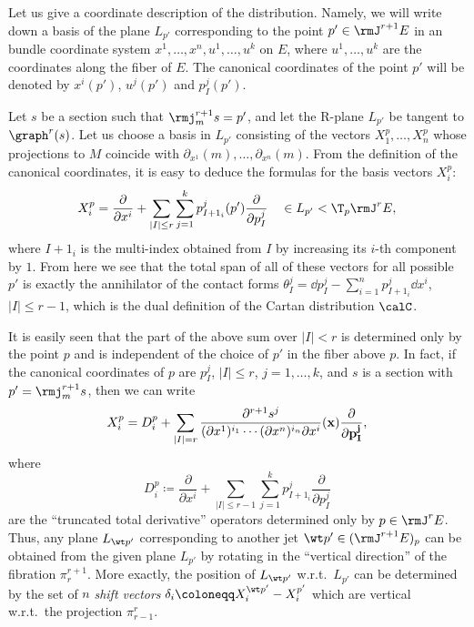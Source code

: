 Let us give a coordinate description of the distribution. Namely, we will write down a basis of the plane $L_{p'}$ corresponding to the point $p'\in \rmJ^{r+1}E$ in an bundle coordinate system $x^1,\ldots,x^n,u^1,\ldots,u^k$ on $E$, where $u^1,\ldots,u^k$ are the coordinates along the fiber of $E$. The canonical coordinates of the point $p'$ will be denoted by $x^i(p')$, $u^j(p')$ and $p^j_I(p')$.

Let $s$ be a section such that $\rmj^{r+1}_m s=p'$, and let the R-plane $L_{p'}$ be tangent to $\graph^r(s)$. Let us choose a basis in $L_{p'}$ consisting of the vectors $X_1^p,\ldots,X_n^p$ whose projections to $M$ coincide with $\partial_{x^1}(m),\ldots,\partial_{x^n}(m)$. From the definition of the canonical coordinates, it is easy to deduce the formulas for the basis vectors $X^p_i$:
\[X^p_i=\frac{\partial}{\partial x^i}+\sum_{|I|\leq r}\sum_{j=1}^k p^j_{I+1_i}(p')\frac{\partial}{\partial p^j_I}\quad \in L_{p'}<\T_p \rmJ^rE,\]
where $I+1_i$ is the multi-index obtained from $I$ by increasing its $i$-th component by $1$. From here we see that the total span of all of these vectors for all possible $p'$ is exactly the annihilator of the contact forms $\theta_I^j=\dd p^j_I-\sum_{i=1}^n p^j_{I+1_i}\dd x^i$, $|I|\leq r-1$, which is the dual definition of the Cartan distribution $\calC$.


It is easily seen that the part of the above sum over $|I|<r$ is determined only by the point $p$ and is independent of the choice of $p'$ in the fiber above $p$. In fact, if the canonical coordinates of $p$ are $p^j_I$, $|I|\leq r$, $j=1,\ldots,k$, and $s$ is a section with $p'=\rmj^{r+1}_m s$, then we can write 
\[X^p_i=D_i^p+\sum_{|I|=r}\frac{\partial^{r+1}s^j}{(\partial x^1)^{i_1}\cdots (\partial x^n)^{i_n}\partial x^i}(\bf{x})\frac{\partial}{\partial p^j_I},\]
where 
\[D_i^p\coloneqq \frac{\partial}{\partial x^i}+\sum_{|I|\leq r-1}\sum_{j=1}^k p^j_{I+1_i}\frac{\partial}{\partial p^j_I}\]
are the ``truncated total derivative'' operators determined only by $p\in \rmJ^rE$. Thus, any plane $L_{\wt p'}$ corresponding to another jet $\wt p'\in (\rmJ^{r+1}E)_p$ can be obtained from the given plane $L_{p'}$ by rotating in the ``vertical direction'' of the fibration $\pi^{r+1}_r$. More exactly, the position of $L_{\wt p'}$ w.r.t.\ $L_{p'}$ can be determined by the set of $n$ \emph{shift vectors} $\delta_i\coloneqq X^{\wt p'}_i-X^{p'}_i$ which are vertical w.r.t.\ the projection $\pi^r_{r-1}$.

